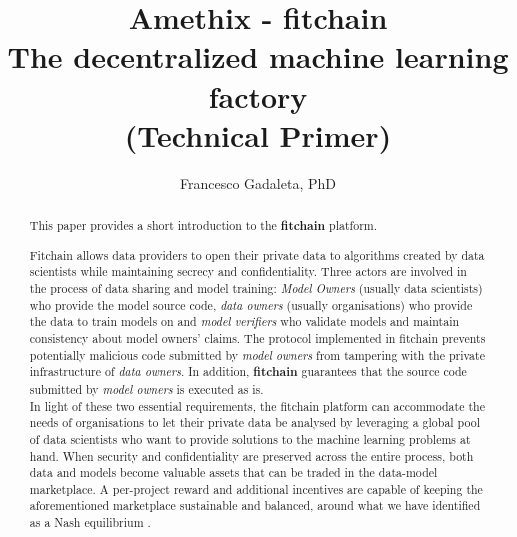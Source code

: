 \documentclass[12pt, a4paper,titlepage]{extreport}
\author{Francesco Gadaleta, PhD}
\date{}
\begin{document}
 
\title{\textbf{Amethix - fitchain}\\ The decentralized machine learning factory\\(Technical Primer) }

\maketitle

\begin{abstract}
This paper provides a short introduction to the \textbf{fitchain} platform. 

Fitchain allows data providers to open their private data to algorithms created by data scientists while maintaining secrecy and confidentiality. Three actors are involved in the process of data sharing and model training: \textit{Model Owners} (usually data scientists) who provide the model source code, \textit{data owners} (usually organisations) who provide the data to train models on and \textit{model verifiers} who validate models and maintain consistency about model owners' claims. 
The protocol implemented in fitchain prevents potentially malicious code submitted by \textit{model owners} from tampering with the private infrastructure of \textit{data owners}. In addition, \textbf{fitchain} guarantees that the source code submitted by \textit{model owners} is executed as is. \\
In light of these two essential requirements, the fitchain platform can accommodate the needs of organisations to let their private data be analysed by leveraging a global pool of data scientists who want to provide solutions to the machine learning problems at hand. When security and confidentiality are preserved across the entire process, both data and models become valuable assets that can be traded in the data-model marketplace. A per-project reward and additional incentives are capable of keeping the aforementioned marketplace sustainable and balanced, around what we have identified as a Nash equilibrium \cite{nash}.
\end{abstract}
\end{document}
